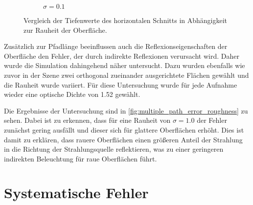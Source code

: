 \documentclass[thesis.tex]{subfiles}
\begin{document}
\begin{figure}[h!]
\begin{subfigure}{0.49\textwidth}
\caption{$\sigma = 0.1$}
\end{subfigure}
\caption{Vergleich der Tiefenwerte des horizontalen Schnitts in Abhängigkeit zur Rauheit der Oberfläche.}
\label{fig:multiple_path_error_roughness}
\end{figure}

Zusätzlich zur Pfadlänge beeinflussen auch die Reflexionseigenschaften der Oberfläche den Fehler, der durch indirekte Reflexionen verursacht wird. Daher wurde die Simulation dahingehend näher untersucht. Dazu wurden ebenfalls wie zuvor in der Szene zwei orthogonal zueinander ausgerichtete Flächen gewählt und die Rauheit wurde variiert. Für diese Untersuchung wurde für jede Aufnahme wieder eine optische Dichte von 1.52 gewählt.

Die Ergebnisse der Untersuchung sind in \autoref{fig:multiple_path_error_roughness} zu sehen. Dabei ist zu erkennen, dass für eine Rauheit von $\sigma = 1.0$ der Fehler zunächst gering ausfällt und dieser sich für glattere Oberflächen erhöht. Dies ist damit zu erklären, dass rauere Oberflächen einen größeren Anteil der Strahlung in die Richtung der Strahlungsquelle reflektieren, was zu einer geringeren indirekten Beleuchtung für raue Oberflächen führt.

\section{Systematische Fehler}
\end{document}
